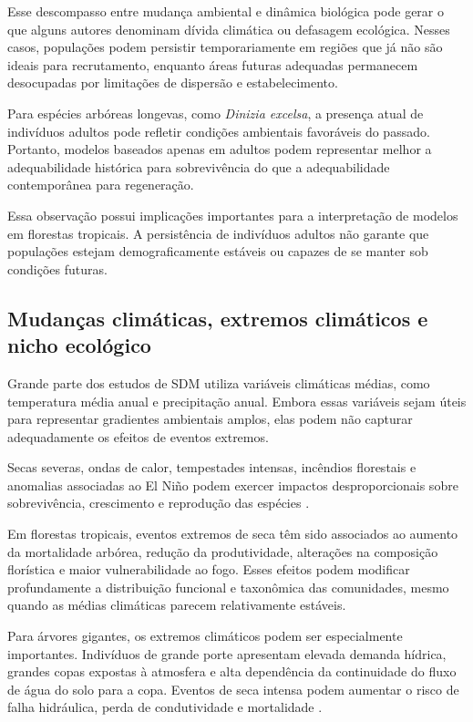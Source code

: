 Esse descompasso entre mudança ambiental e dinâmica biológica pode gerar o que alguns autores denominam dívida climática ou defasagem ecológica. Nesses casos, populações podem persistir temporariamente em regiões que já não são ideais para recrutamento, enquanto áreas futuras adequadas permanecem desocupadas por limitações de dispersão e estabelecimento.

\begin{aplicacao}
	Para espécies arbóreas longevas, como \textit{Dinizia excelsa}, a presença atual de indivíduos adultos pode refletir condições ambientais favoráveis do passado. Portanto, modelos baseados apenas em adultos podem representar melhor a adequabilidade histórica para sobrevivência do que a adequabilidade contemporânea para regeneração.
\end{aplicacao}

Essa observação possui implicações importantes para a interpretação de modelos em florestas tropicais. A persistência de indivíduos adultos não garante que populações estejam demograficamente estáveis ou capazes de se manter sob condições futuras.

\subsection{Mudanças climáticas, extremos climáticos e nicho ecológico}

Grande parte dos estudos de SDM utiliza variáveis climáticas médias, como temperatura média anual e precipitação anual. Embora essas variáveis sejam úteis para representar gradientes ambientais amplos, elas podem não capturar adequadamente os efeitos de eventos extremos.

Secas severas, ondas de calor, tempestades intensas, incêndios florestais e anomalias associadas ao El Niño podem exercer impactos desproporcionais sobre sobrevivência, crescimento e reprodução das espécies \parencite{allen2010,marengo2018}.

Em florestas tropicais, eventos extremos de seca têm sido associados ao aumento da mortalidade arbórea, redução da produtividade, alterações na composição florística e maior vulnerabilidade ao fogo. Esses efeitos podem modificar profundamente a distribuição funcional e taxonômica das comunidades, mesmo quando as médias climáticas parecem relativamente estáveis.

Para árvores gigantes, os extremos climáticos podem ser especialmente importantes. Indivíduos de grande porte apresentam elevada demanda hídrica, grandes copas expostas à atmosfera e alta dependência da continuidade do fluxo de água do solo para a copa. Eventos de seca intensa podem aumentar o risco de falha hidráulica, perda de condutividade e mortalidade \parencite{mcDowell2008,choat2012}.

